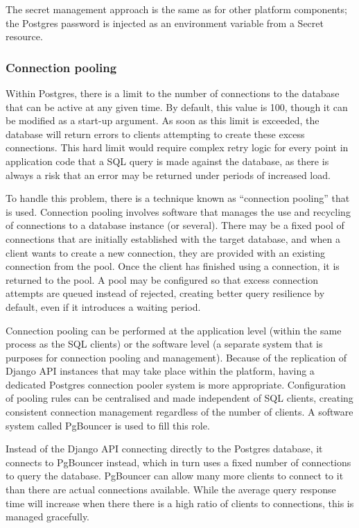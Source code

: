 The secret management approach is the same as for other platform components; the Postgres password is injected as an environment variable from a Secret resource.

\subsubsection{Connection pooling}

Within Postgres, there is a limit to the number of connections to the database that can be active at any given time. By default, this value is 100, though it can be modified as a start-up argument. As soon as this limit is exceeded, the database will return errors to clients attempting to create these excess connections. This hard limit would require complex retry logic for every point in application code that a SQL query is made against the database, as there is always a risk that an error may be returned under periods of increased load.

To handle this problem, there is a technique known as ``connection pooling'' that is used. Connection pooling involves software that manages the use and recycling of connections to a database instance (or several). There may be a fixed pool of connections that are initially established with the target database, and when a client wants to create a new connection, they are provided with an existing connection from the pool. Once the client has finished using a connection, it is returned to the pool. A pool may be configured so that excess connection attempts are queued instead of rejected, creating better query resilience by default, even if it introduces a waiting period.

Connection pooling can be performed at the application level (within the same process as the SQL clients) or the software level (a separate system that is purposes for connection pooling and management). Because of the replication of Django API instances that may take place within the platform, having a dedicated Postgres connection pooler system is more appropriate. Configuration of pooling rules can be centralised and made independent of SQL clients, creating consistent connection management regardless of the number of clients. A software system called PgBouncer is used to fill this role.

Instead of the Django API connecting directly to the Postgres database, it connects to PgBouncer instead, which in turn uses a fixed number of connections to query the database. PgBouncer can allow many more clients to connect to it than there are actual connections available. While the average query response time will increase when there there is a high ratio of clients to connections, this is managed gracefully.

